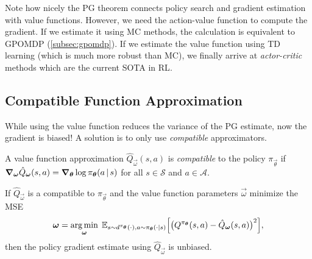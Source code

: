 		Note how nicely the \ac{PG} theorem connects policy search and gradient estimation with value functions. However, we need the action-value function to compute the gradient. If we estimate it using \ac{MC} methods, the calculation is equivalent to \ac{GPOMDP} (\autoref{subsec:gpomdp}). If we estimate the value function using \ac{TD} learning (which is much more robust than \ac{MC}), we finally arrive at \emph{actor-critic} methods which are the current \ac{SOTA} in \ac{RL}.

		\subsection{Compatible Function Approximation}
			While using the value function reduces the variance of the \ac{PG} estimate, now the gradient is biased! A solution is to only use \emph{compatible} approximators.
			\begin{definition}
				A value function approximation \( \hat{Q}_{\vec{\omega}}(s, a) \) is \emph{compatible} to the policy \(\pi_{\vec{\theta}}\) if \( \grad_{\bm{\omega}} \hat{Q}_{\bm{\omega}}(s, a) = \grad_{\bm{\theta}} \log \pi_{\bm{\theta}}(a \,\vert\, s) \) for all \(s \in \mathcal{S}\) and \(a \in \mathcal{A}\).
			\end{definition}
			\begin{theorem}
				If \(\hat{Q}_{\vec{\omega}}\) is a compatible to \(\pi_{\vec{\theta}}\) and the value function parameters \(\vec{\omega}\) minimize the \ac{MSE}
				\begin{equation}
					\bm{\omega} = \operatorname*{arg\,min}_{\bm{\omega}} \; \mathbb{E}_{s \sim d^{\pi_{\bm{\theta}}}(\cdot), a \sim \pi_{\bm{\theta}}(\cdot \vert s)}\Bigl[ \bigl( Q^{\pi_{\bm{\theta}}}(s, a) - \hat{Q}_{\bm{\omega}}(s, a) \bigr)^2 \Bigr],
				\end{equation}
				then the policy gradient estimate using \(\hat{Q}_{\vec{\omega}}\) is unbiased.
			\end{theorem}
